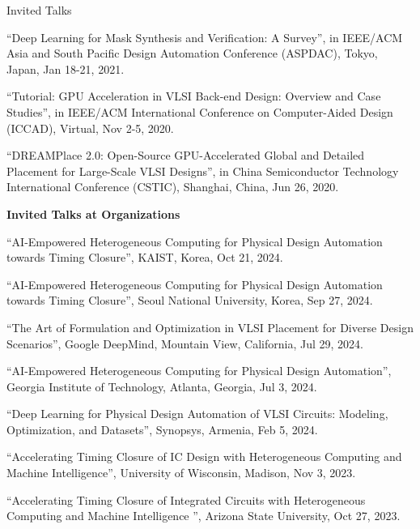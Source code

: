 \begin{rSection}{Invited Talks}
\begin{description}[font=\normalfont]
\item[{[3]}]{
``Deep Learning for Mask Synthesis and Verification: A Survey'', in IEEE/ACM Asia and South Pacific Design Automation Conference (ASPDAC), Tokyo, Japan, Jan 18-21, 2021.
}

\item[{[2]}]{
``Tutorial: GPU Acceleration in VLSI Back-end Design: Overview and Case Studies'', in IEEE/ACM International Conference on Computer-Aided Design (ICCAD), Virtual, Nov 2-5, 2020. 
}

\item[{[1]}]{
``DREAMPlace 2.0: Open-Source GPU-Accelerated Global and Detailed Placement for Large-Scale VLSI Designs'', in China Semiconductor Technology International Conference (CSTIC), Shanghai, China, Jun 26, 2020. 
}

\end{description}

\textbf{Invited Talks at Organizations}
        
\begin{description}[font=\normalfont]

\item[{[13]}]{
``AI-Empowered Heterogeneous Computing for Physical Design Automation towards Timing Closure'', KAIST, Korea, Oct 21, 2024. 
}

\item[{[12]}]{
``AI-Empowered Heterogeneous Computing for Physical Design Automation towards Timing Closure'', Seoul National University, Korea, Sep 27, 2024. 
}

\item[{[11]}]{
``The Art of Formulation and Optimization in VLSI Placement for Diverse Design Scenarios'', Google DeepMind, Mountain View, California, Jul 29, 2024. 
}

\item[{[10]}]{
``AI-Empowered Heterogeneous Computing for Physical Design Automation'', Georgia Institute of Technology, Atlanta, Georgia, Jul 3, 2024. 
}

\item[{[9]}]{
``Deep Learning for Physical Design Automation of VLSI Circuits: Modeling, Optimization, and Datasets'', Synopsys, Armenia, Feb 5, 2024. 
}

\item[{[8]}]{
``Accelerating Timing Closure of IC Design with Heterogeneous Computing and Machine Intelligence'', University of Wisconsin, Madison, Nov 3, 2023. 
}

\item[{[7]}]{
``Accelerating Timing Closure of Integrated Circuits with Heterogeneous Computing and Machine Intelligence '', Arizona State University, Oct 27, 2023. 
}


\end{description}
\end{rSection}
